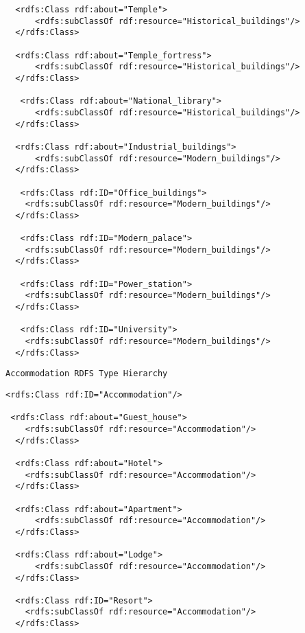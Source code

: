 \begin{verbatim}
  <rdfs:Class rdf:about="Temple">
      <rdfs:subClassOf rdf:resource="Historical_buildings"/>
  </rdfs:Class>
  
  <rdfs:Class rdf:about="Temple_fortress">
      <rdfs:subClassOf rdf:resource="Historical_buildings"/>
  </rdfs:Class>
  
   <rdfs:Class rdf:about="National_library">
      <rdfs:subClassOf rdf:resource="Historical_buildings"/>
  </rdfs:Class>

  <rdfs:Class rdf:about="Industrial_buildings">
      <rdfs:subClassOf rdf:resource="Modern_buildings"/>
  </rdfs:Class>
  
   <rdfs:Class rdf:ID="Office_buildings">
    <rdfs:subClassOf rdf:resource="Modern_buildings"/>
  </rdfs:Class>
  
   <rdfs:Class rdf:ID="Modern_palace">
    <rdfs:subClassOf rdf:resource="Modern_buildings"/>
  </rdfs:Class>
  
   <rdfs:Class rdf:ID="Power_station">
    <rdfs:subClassOf rdf:resource="Modern_buildings"/>
  </rdfs:Class>
  
   <rdfs:Class rdf:ID="University">
    <rdfs:subClassOf rdf:resource="Modern_buildings"/>
  </rdfs:Class>
  \end{verbatim}
\vspace{-0.25in}

\begin{verbatim}
Accommodation RDFS Type Hierarchy
\end{verbatim}

\vspace{-0.25in}

\begin{verbatim}
<rdfs:Class rdf:ID="Accommodation"/>
 
 <rdfs:Class rdf:about="Guest_house">
    <rdfs:subClassOf rdf:resource="Accommodation"/>
  </rdfs:Class>

  <rdfs:Class rdf:about="Hotel">
    <rdfs:subClassOf rdf:resource="Accommodation"/>
  </rdfs:Class>
  
  <rdfs:Class rdf:about="Apartment">
      <rdfs:subClassOf rdf:resource="Accommodation"/>
  </rdfs:Class>

  <rdfs:Class rdf:about="Lodge">
      <rdfs:subClassOf rdf:resource="Accommodation"/>
  </rdfs:Class>
   
  <rdfs:Class rdf:ID="Resort">
    <rdfs:subClassOf rdf:resource="Accommodation"/>
  </rdfs:Class>
 
\end{verbatim}

